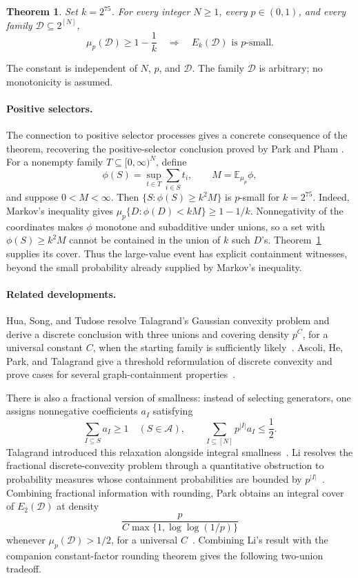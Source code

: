 \documentclass[11pt,letterpaper]{article}
\newtheorem{theorem}{Theorem}[section]
\theoremstyle{definition}
\theoremstyle{remark}
\numberwithin{equation}{section}
\begin{document}
\begin{theorem}
\label{thm:main}
Set $k=2^{75}$. For every integer $N\ge1$, every $p\in(0,1)$, and every
family $\mathcal D\subseteq2^{[N]}$,
\[
\mu_p(\mathcal D)\ge1-\frac1k
\quad\Longrightarrow\quad
E_k(\mathcal D)\text{ is }p\text{-small}.
\]
\end{theorem}

The constant is independent of $N$, $p$, and $\mathcal D$.
The family $\mathcal D$ is arbitrary; no monotonicity is assumed.

\paragraph{Positive selectors.}
The connection to positive selector processes
\cite[Section~7]{Talagrand10}
gives a concrete consequence of the theorem, recovering the
positive-selector conclusion proved by Park and Pham
\cite[Theorem~1.2]{ParkPham24}. For a nonempty family
$T\subseteq[0,\infty)^N$, define
\[
\phi(S)=\sup_{t\in T}\sum_{i\in S}t_i,
\qquad M=\mathbb E_{\mu_p}\phi,
\]
and suppose $0<M<\infty$. Then
$\{S:\phi(S)\ge k^2M\}$ is $p$-small for $k=2^{75}$.
Indeed, Markov's inequality gives
$\mu_p\{D:\phi(D)<kM\}\ge1-1/k$.
Nonnegativity of the coordinates makes $\phi$ monotone and subadditive
under unions, so a set with $\phi(S)\ge k^2M$ cannot be contained in
the union of $k$ such $D$'s. Theorem~\ref{thm:main} supplies its cover.
Thus the large-value event has explicit containment witnesses, beyond
the small probability already supplied by Markov's inequality.

\paragraph{Related developments.}
Hua, Song, and Tudose resolve Talagrand's Gaussian convexity problem and
derive a discrete conclusion with three unions and covering density
$p^C$, for a universal constant $C$, when the starting family is
sufficiently likely~\cite[Corollaries~1.3--1.4]{HuaSongTudose26}.
Ascoli, He, Park, and Talagrand give a threshold reformulation of discrete
convexity and prove cases for several graph-containment
properties~\cite[Proposition~1.5 and Theorems~1.10--1.13]{AscoliEtAl26}.

There is also a fractional version of smallness: instead of selecting
generators, one assigns nonnegative coefficients $a_I$ satisfying
\[
\sum_{I\subseteq S}a_I\ge1\quad(S\in\mathcal A),
\qquad
\sum_{I\subseteq[N]}p^{|I|}a_I\le\frac12.
\]
Talagrand introduced this relaxation alongside integral
smallness~\cite[Sections~6 and~7]{Talagrand10}.
Li resolves the fractional discrete-convexity problem through a quantitative
obstruction to probability measures whose containment probabilities
are bounded by $p^{|I|}$~\cite[Theorem~1.9]{Li26}.
Combining fractional information with rounding, Park obtains an integral
cover of $E_2(\mathcal D)$ at density
\[
\frac{p}{C\max\{1,\log\log(1/p)\}}
\]
whenever $\mu_p(\mathcal D)>1/2$, for a universal
$C$~\cite[Corollary~3.5]{Park26}.
Combining Li's result with the companion constant-factor rounding theorem
gives the following two-union tradeoff.
\end{document}
